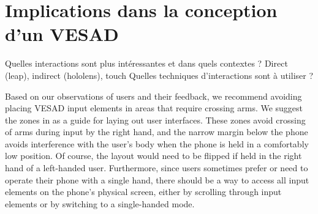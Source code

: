 





\section{Implications dans la conception d'un VESAD}
\label{sec:discussion_consequences}
Quelles interactions sont plus intéressantes et dans quels contextes ? Direct (leap), indirect (hololens), touch
Quelles techniques d'interactions sont à utiliser ?

Based on our observations of users and their feedback, we recommend avoiding placing VESAD input elements in areas that require crossing arms. We suggest the zones in  as a guide for laying out user interfaces. These zones avoid crossing of arms during input by the right hand, and the narrow margin below the phone avoids interference with the user's body when the phone is held in a comfortably low position. Of course, the layout would need to be flipped if held in the right hand of a left-handed user. Furthermore, since users sometimes prefer or need to operate their phone with a single hand, there should be a way to access all input elements on the phone's physical screen, either by scrolling through input elements or by switching to a single-handed mode.

